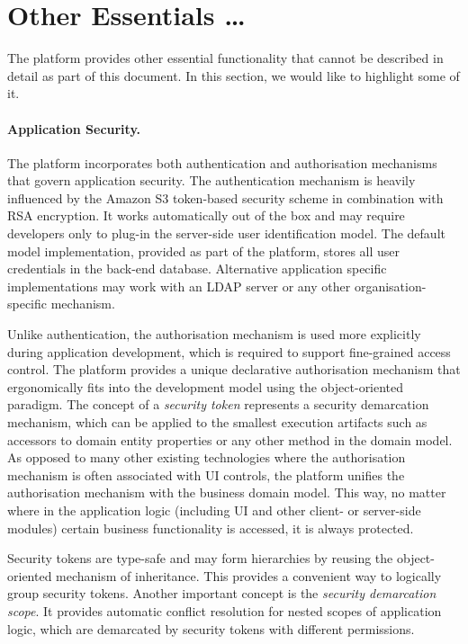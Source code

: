 \section{Other Essentials \ldots}\label{sec:07}

  The platform provides other essential functionality that cannot be described in detail as part of this document.
  In this section, we would like to highlight some of it.

  \paragraph{Application Security.}
  The platform incorporates both authentication and authorisation mechanisms that govern application security.
  The authentication mechanism is heavily influenced by the Amazon S3 token-based security scheme in combination with RSA encryption.
  It works automatically out of the box and may require developers only to plug-in the server-side user identification model.
  The default model implementation, provided as part of the platform, stores all user credentials in the back-end database.
  Alternative application specific implementations may work with an LDAP server or any other organisation-specific mechanism.
  
  Unlike authentication, the authorisation mechanism is used more explicitly during application development, which is required to support fine-grained access control.
  The platform provides a unique declarative authorisation mechanism that ergonomically fits into the development model using the object-oriented paradigm.
  The concept of a \emph{security token} represents a security demarcation mechanism, which can be applied to the smallest execution artifacts such as accessors to domain entity properties or any other method in the domain model.
  As opposed to many other existing technologies where the authorisation mechanism is often associated with UI controls, the platform unifies the authorisation mechanism with the business domain model.
  This way, no matter where in the application logic (including UI and other client- or server-side modules) certain business functionality is accessed, it is always protected.
  
  Security tokens are type-safe and may form hierarchies by reusing the object-oriented mechanism of inheritance.
  This provides a convenient way to logically group security tokens.
  Another important concept is the \emph{security demarcation scope}.
  It provides automatic conflict resolution for nested scopes of application logic, which are demarcated by security tokens with different permissions.
 
